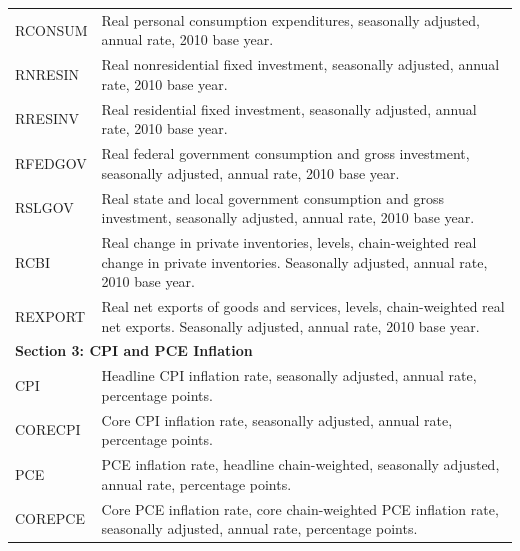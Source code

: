 \documentclass[11pt,letterpaper]{scrartcl}
\begin{document}
\begin{table}[H]
\begin{tabular}{p{1.8cm}p{14.2cm}}
RCONSUM & Real personal consumption expenditures, seasonally adjusted, annual rate, 2010 base year. \\
RNRESIN & Real nonresidential fixed investment, seasonally adjusted, annual rate, 2010 base year. \\
RRESINV & Real residential fixed investment, seasonally adjusted, annual rate, 2010 base year. \\
RFEDGOV & Real federal government consumption and gross investment, seasonally adjusted, annual rate, 2010 base year. \\
RSLGOV & Real state and local government consumption and gross investment, seasonally adjusted, annual rate, 2010 base year. \\
RCBI & Real change in private inventories, levels, chain-weighted real change in private inventories. Seasonally adjusted, annual rate, 2010 base year. \\
REXPORT & Real net exports of goods and services, levels, chain-weighted real net exports. Seasonally adjusted, annual rate, 2010 base year. \\
\hline
\multicolumn{2}{l}{\textbf{Section 3: CPI and PCE Inflation}} \\
\hline
CPI & Headline CPI inflation rate, seasonally adjusted, annual rate, percentage points. \\
CORECPI & Core CPI inflation rate, seasonally adjusted, annual rate, percentage points. \\
PCE & PCE inflation rate, headline chain-weighted, seasonally adjusted, annual rate, percentage points. \\
COREPCE & Core PCE inflation rate, core chain-weighted PCE inflation rate, seasonally adjusted, annual rate, percentage points. \\
\bottomrule
\end{tabular}
\end{table}
\clearpage


\begin{table}[h!]
    \centering
    \footnotesize{
    
    }
    \caption{
    \textbf{Definitions of forecaster characteristics}
    \vspace{5pt}\\
    \footnotesize{The table shows definitions of forecaster characteristics, including inferred gender, affiliation, education, position, and public media engagement. The table is based on publicly available sources and may not fully capture the breadth of forecaster characteristics.}}
    \label{tab:forecaster_characteristics_definitions}
\end{table}
\clearpage
\end{document}
